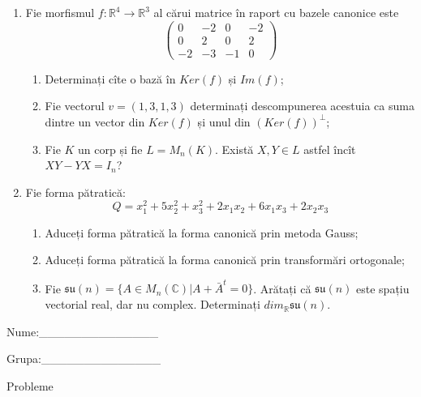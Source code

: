\documentclass{article}
\begin{document}
\begin{enumerate}
 \item Fie morfismul $f:\mathbb{R}^4 \to \mathbb{R}^3$ al cărui matrice în raport cu bazele canonice este
$$\begin{pmatrix}
0&-2&0&-2\\
0&2&0&2\\
-2&-3&-1&0
\end{pmatrix}$$

\begin{enumerate}
\item Determinați cîte o bază în $Ker(f)$ și $Im(f)$;
\item Fie vectorul $v=(1,3,1,3)$ determinați descompunerea acestuia ca suma dintre un vector din $Ker(f)$ și unul din $(Ker(f))^\perp$;
\item Fie $K$ un corp și fie $L=M_n(K)$. Există $X,Y \in L$ astfel încît $XY-YX=I_n$?  
\end{enumerate}
\item Fie forma pătratică:
$$Q= x_1^2+5x_2^2+x_3^2+2x_1x_2+6x_1x_3+2x_2x_3$$

\begin{enumerate}
\item Aduceți forma pătratică la forma canonică prin metoda Gauss;
\item Aduceți forma pătratică la forma canonică prin transformări ortogonale;
\item Fie $\mathfrak{su}(n)=\{ A \in M_n(\mathbb{C}) | A+\bar{A}^t=0\}$. Arătați că $\mathfrak{su}(n)$ este spațiu vectorial real, dar nu complex.
Determinați $dim_{\mathbb{R}}\mathfrak{su}(n)$.
\end{enumerate}
\end{enumerate}
\newpage
\begin{flushright}
Nume:\_\_\_\_\_\_\_\_\_\_\_\_\_\_
 
 
Grupa:\_\_\_\_\_\_\_\_\_\_\_\_\_\_
\end{flushright}
\begin{center}
\vspace{2cm}
{\Large Probleme}
\vspace{2cm}
\end{center}
\end{document}
